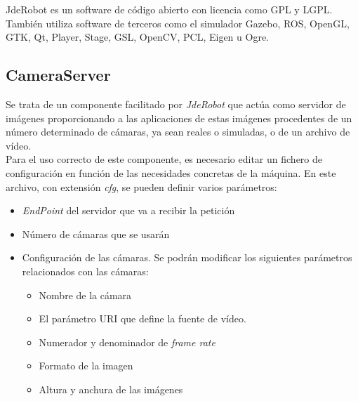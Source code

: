 \documentclass[a4paper, 12pt, oneside]{book}
\begin{document}
JdeRobot es un software de código abierto con licencia como GPL y LGPL. También utiliza software de terceros como el simulador Gazebo, ROS, OpenGL, GTK, Qt, Player, Stage, GSL, OpenCV, PCL, Eigen u Ogre.


\subsection{CameraServer}\label{Camera}

Se trata de un componente facilitado por \textit{JdeRobot} que actúa como servidor de imágenes proporcionando a las aplicaciones de estas imágenes procedentes de un número determinado de cámaras, ya sean reales o simuladas, o de un archivo de vídeo.\\

Para el uso correcto de este componente, es necesario editar un fichero de configuración en función de las necesidades concretas de la máquina. En este archivo, con extensión \textit{cfg}, se pueden definir varios parámetros:

\begin{itemize}
\item \textit{EndPoint} del servidor que va a recibir la petición
\item Número de cámaras que se usarán
\item Configuración de las cámaras. Se podrán modificar los siguientes parámetros relacionados con las cámaras:
\begin{itemize}
\item Nombre de la cámara
\item El parámetro URI que define la fuente de vídeo.
\item Numerador y denominador de \textit{frame rate}
\item Formato de la imagen
\item Altura y anchura de las imágenes
\end{itemize}
\end{itemize}
\end{document}
